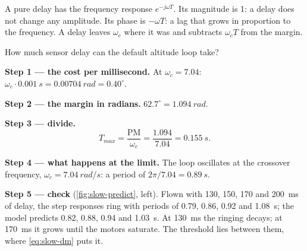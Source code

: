 A pure delay has the frequency response $e^{-j\omega T}$. Its magnitude is 1: a delay does not change any amplitude. Its phase is $-\omega T$: a lag that grows in proportion to the frequency. A delay leaves $\omega_c$ where it was and subtracts $\omega_cT$ from the margin.

\begin{example}
\label{ex:slow-dm}
How much sensor delay can the default altitude loop take?

\textbf{Step 1 — the cost per millisecond.} At $\omega_c = 7.04$: $\omega_c \cdot \SI{0.001}{s} = \SI{0.00704}{rad} = 0.40^\circ$.

\textbf{Step 2 — the margin in radians.} $62.7^\circ = \SI{1.094}{rad}$.

\textbf{Step 3 — divide.}
\begin{equation}\label{eq:slow-dm}
  T_{max} = \frac{\mathrm{PM}}{\omega_c} = \frac{1.094}{7.04} = \SI{0.155}{s}.
\end{equation}

\textbf{Step 4 — what happens at the limit.} The loop oscillates at the crossover frequency, $\omega_c = \SI{7.04}{rad/s}$: a period of $2\pi/7.04 = \SI{0.89}{s}$.

\textbf{Step 5 — check} (\cref{fig:slow-predict}, left). Flown with 130, 150, 170 and \SI{200}{ms} of delay, the step responses ring with periods of 0.79, 0.86, 0.92 and \SI{1.08}{s}; the model predicts 0.82, 0.88, 0.94 and \SI{1.03}{s}. At \SI{130}{ms} the ringing decays; at \SI{170}{ms} it grows until the motors saturate. The threshold lies between them, where \cref{eq:slow-dm} puts it.
\end{example}



